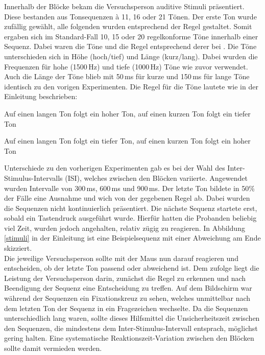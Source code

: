 \documentclass[doc,a4paper,12pt]{apa6}
\begin{document}
Innerhalb der Blöcke bekam die Versuchsperson auditive Stimuli präsentiert. Diese bestanden aus Tonsequenzen à 11, 16 oder 21 Tönen. Der erste Ton wurde zufällig gewählt, alle folgenden wurden entsprechend der Regel gestaltet. Somit ergaben sich im Standard-Fall 10, 15 oder 20 regelkonforme Töne innerhalb einer Sequenz. Dabei waren die Töne und die Regel entsprechend derer bei \textcite{paavilainen2007preattentive}. Die Töne unterschieden sich in Höhe (hoch/tief) und Länge (kurz/lang). Dabei wurden die Frequenzen für hohe (1500\,Hz) und tiefe (1000\,Hz) Töne wie zuvor verwendet. Auch die Länge der Töne blieb mit 50\,ms für kurze und 150\,ms für lange Töne identisch zu den vorigen Experimenten. Die Regel für die Töne lautete wie in der Einleitung beschrieben:

\begin{compactitem}
  \item Auf einen langen Ton folgt ein hoher Ton, auf einen kurzen Ton folgt ein tiefer
Ton
  \item Auf einen langen Ton folgt ein tiefer Ton, auf einen kurzen Ton folgt ein hoher
Ton
\end{compactitem}

Unterschiede zu den vorherigen Experimenten gab es bei der Wahl des Inter-Stimulus-Intervalls (ISI), welches zwischen den Blöcken variierte. Angewendet wurden Intervalle von 300\,ms, 600\,ms und 900\,ms. Der letzte Ton bildete in 50\% der Fälle eine Ausnahme und wich von der gegebenen Regel ab. Dabei wurden die Sequenzen nicht kontinuierlich präsentiert. Die nächste Sequenz startete erst, sobald ein Tastendruck ausgeführt wurde. Hierfür hatten die Probanden beliebig viel Zeit, wurden jedoch angehalten, relativ zügig zu reagieren. In Abbildung \ref{stimuli} in der Einleitung ist eine Beispielsequenz mit einer Abweichung am Ende skizziert.\\
Die jeweilige Versuchsperson sollte mit der Maus nun darauf reagieren und entscheiden, ob der letzte Ton passend oder abweichend ist. Dem zufolge liegt die Leistung der Versuchsperson darin, zunächst die Regel zu erkennen und nach Beendigung der Sequenz eine Entscheidung zu treffen. Auf dem Bildschirm war während der Sequenzen ein Fixationskreuz zu sehen, welches unmittelbar nach dem letzten Ton der Sequenz in ein Fragezeichen wechselte. Da die Sequenzen unterschiedlich lang waren, sollte dieses Hilfsmittel die Unsicherheitszeit zwischen den Sequenzen, die mindestens dem Inter-Stimulus-Intervall entsprach, möglichst gering halten. Eine systematische Reaktionszeit-Variation zwischen den Blöcken sollte damit vermieden werden.
\end{document}
